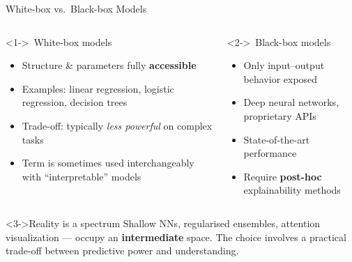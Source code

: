 \documentclass[aspectratio=169]{beamer}
\begin{document}
\begin{frame}{White-box vs.\ Black-box Models}
  \vspace{-0.2em}
  \begin{columns}[T]
      \begin{block}<1->{\faUnlock\ White-box models}
        \begin{itemize}
          \item Structure \& parameters fully \textbf{accessible}
          \item Examples: linear regression, logistic regression, decision trees
          \item Trade-off: typically \emph{less powerful} on complex tasks
          \item Term is sometimes used interchangeably with ``interpretable'' models
        \end{itemize}
      \end{block}
      \begin{alertblock}<2->{\faLock\ Black-box models}
        \begin{itemize}
          \item Only input--output behavior exposed
          \item Deep neural networks, proprietary APIs
          \item State-of-the-art performance
          \item Require \textbf{post-hoc} explainability methods
        \end{itemize}
      \end{alertblock}
  \end{columns}
  \vspace{0.5em}
  \begin{exampleblock}<3->{Reality is a spectrum}
    Shallow NNs, regularised ensembles, attention visualization --- occupy an
    \textbf{intermediate} space. The choice involves a practical trade-off between predictive power and understanding.
  \end{exampleblock}
\end{frame}
\end{document}
